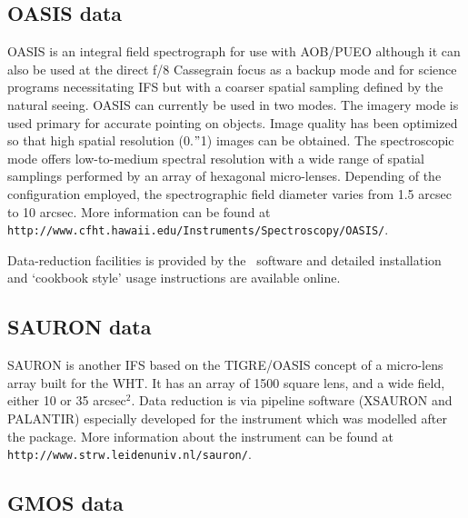 \documentclass[twoside,11pt]{article}
\newcommand{\htmladdnormallink}[2]{#1}
\newcommand{\htmlref}[2]{#1}
\newcommand{\latex}[1]{#1}
\newcommand{\xlabel}[1]{}
\begin{document}
\subsection{\xlabel{sc16_oasis}OASIS data\label{sc16_oasis}}

\htmladdnormallink{OASIS}{http://www.cfht.hawaii.edu/Instruments/Spectroscopy/OASIS/}
is an integral field spectrograph for use with
\htmladdnormallink{AOB/PUEO}{http://www.cfht.hawaii.edu/Instruments/Imaging/AOB/}
although it can also be used at the direct f/8 Cassegrain focus as a
backup mode and for science programs necessitating IFS but with a
coarser spatial sampling defined by the natural seeing.  OASIS can
currently be used in two modes.  The imagery mode is used primary for
accurate pointing on objects.  Image quality has been optimized so that
high spatial resolution (0.$"$1) images can be obtained.  The
spectroscopic mode offers low-to-medium spectral resolution with a wide
range of spatial samplings performed by an array of hexagonal
micro-lenses.  Depending of the configuration employed, the
spectrographic field diameter varies from 1.5 arcsec to 10
arcsec.\latex{ More information can be found at {\tt
http://www.cfht.hawaii.edu/Instruments/Spectroscopy/OASIS/}.}

Data-reduction facilities is provided by the \htmladdnormallink{\XOASIS\
software}{http://www.cfht.hawaii.edu/Instruments/Spectroscopy/OASIS/Reduc/}
and detailed installation and `cookbook style' usage instructions
are available online.

\subsection{\xlabel{sc16_sauron}SAURON data\label{sc16_sauron}}

\htmladdnormallink{SAURON}{http://www.strw.leidenuniv.nl/sauron/}
is another IFS based on the TIGRE/\htmlref{OASIS}{sc16_oasis} concept
of a micro-lens array built for the WHT.  It has an array of 1500
square lens, and a wide field, either 10 or 35 arcsec$^2$.  Data
reduction is via pipeline software ({\footnotesize XSAURON\normalsize}
and {\footnotesize PALANTIR}\normalsize) especially developed for the
instrument which was modelled after the
\htmladdnormallink{\XOASIS}{http://www.cfht.hawaii.edu/Instruments/Spectroscopy/OASIS/Reduc/}
package.\latex{ More information about the instrument can be found
at {\tt http://www.strw.leidenuniv.nl/sauron/}.}

\subsection{\xlabel{sc16_gmos}GMOS data\label{sc16_gmos}}
\end{document}
